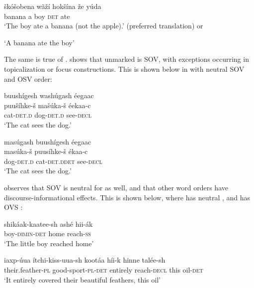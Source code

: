 \documentclass[output=paper]{LSP/langsci}
\begin{document}
\begin{exe}
\ex\label{ex:jrs:22}	\gll  \v{s}k\'o\v{s}obena w\~a\v{z}\'i 	hok\v{s}\'ina 	\v{z}e 		y\'uda \\
banana 		a 			boy 	\textsc{det} 	ate \\
\trans `The boy ate a banana (not the apple).' (preferred translation) or 

`A banana ate the boy'  \citep[49]{West2003} 
\end{exe}

The same is true of .  \citet{Boyle2007} shows that unmarked  is SOV, with exceptions occurring in topicalization or focus constructions.  This is shown below in  with neutral SOV  and  OSV order:

\begin{exe}
\ex\label{ex:jrs:23} 
\glll buush\'igesh wash\'ugash \'eegaac\\
puu\v{s}\'ihke-\v{s}  ma\v{s}\'uka-\v{s} \'eekaa-c \\
cat-\textsc{det.d} dog-\textsc{det.d} see-\textsc{decl}  \\
\trans `The cat sees the dog.'  \citep[214]{Boyle2007}

\ex\label{ex:jrs:24} 
\glll mas\'ugash 		buush\'igesh 	\'eegaac\\
mas\'uka-\v{s} 		puus\'ihke-\v{s} 	\'ekaa-c \\
dog-\textsc{det.d} 		cat-\textsc{det.d}\textsc{det}	see-\textsc{decl} \\
\trans `The cat sees the dog.' \citep[214]{Boyle2007}

\end{exe}
	
\citet{Graczyk1991a} observes that SOV is neutral  for  as well, and that other word orders have discourse-informational effects.  This is shown below, where  has neutral , and  has OVS :

\begin{exe}
\ex\label{ex:jrs:25} \gll shik\'aak-kaatee-sh ash\'e 		hii-\'ak \\
boy-\textsc{dimin-det} 		home 	reach-\textsc{ss} \\
\trans `The little boy reached home' \citep[101]{Graczyk1991a}

\ex\label{ex:jrs:26} \gll iaxp-\'uua 		\'itchi-kiss-uua-sh			koot\'aa 	h\'ii-k 	hinne		tal\'ee-sh \\
their.feather-\textsc{pl} good-sport-\textsc{pl}-\textsc{det}		entirely 	reach-\textsc{decl}	this 	oil-\textsc{det} \\
\trans `It entirely covered their beautiful feathers, this oil' \citep[103]{Graczyk1991a}
\end{exe}
\end{document}

